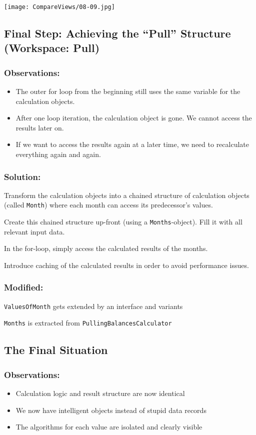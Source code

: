 \documentclass[a4paper,fleqn,titlepage,11pt]{article}
\begin{document}
\texttt{[image: CompareViews/08-09.jpg]}


\subsection*{Final Step: Achieving the ``Pull'' Structure (Workspace: Pull)}

\subsubsection*{Observations:}

\begin{itemize}
\item The outer for loop from the beginning still uses the same variable for the calculation objects.
\item After one loop iteration, the calculation object is gone. We cannot access the results later on.
\item If we want to access the results again at a later time, we need to recalculate everything again and again.
\end{itemize}

\subsubsection*{Solution:}

Transform the calculation objects into a chained structure of calculation objects (called \texttt{Month}) where each month can access its predecessor's values.

Create this chained structure up-front (using a \texttt{Months}-object). Fill it with all relevant input data.

In the for-loop, simply access the calculated results of the months.

Introduce caching of the calculated results in order to avoid performance issues.

\subsubsection*{Modified:}

\texttt{ValuesOfMonth} gets extended by an interface and variants

\texttt{Months} is extracted from \texttt{PullingBalancesCalculator}

\subsection*{The Final Situation}

\subsubsection*{Observations:}

\begin{itemize}
\item Calculation logic and result structure are now identical
\item We now have intelligent objects instead of stupid data records
\item The algorithms for each value are isolated and clearly visible
\end{itemize}
\end{document}
